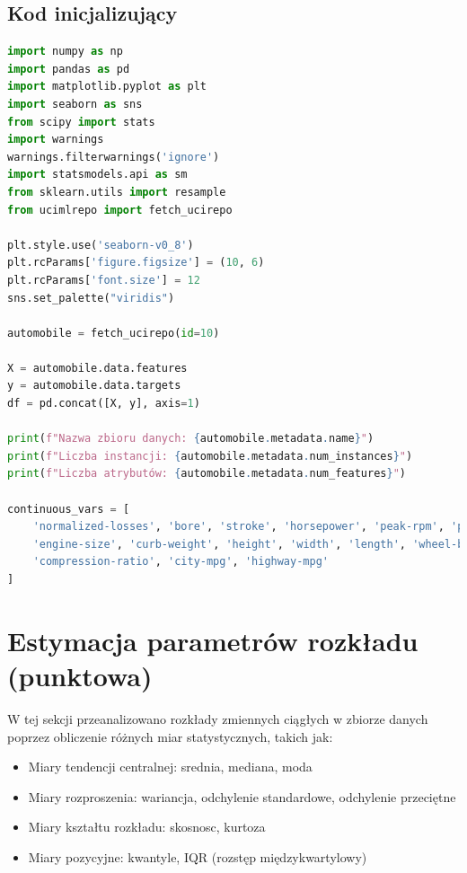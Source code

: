 \documentclass[12pt,a4paper]{article}
\begin{document}
\subsection{Kod inicjalizujący}
\begin{lstlisting}[language=Python, caption=Import bibliotek i wczytywanie danych]
import numpy as np
import pandas as pd
import matplotlib.pyplot as plt
import seaborn as sns
from scipy import stats
import warnings
warnings.filterwarnings('ignore')
import statsmodels.api as sm
from sklearn.utils import resample
from ucimlrepo import fetch_ucirepo

plt.style.use('seaborn-v0_8')
plt.rcParams['figure.figsize'] = (10, 6)
plt.rcParams['font.size'] = 12
sns.set_palette("viridis")

automobile = fetch_ucirepo(id=10)

X = automobile.data.features
y = automobile.data.targets
df = pd.concat([X, y], axis=1)

print(f"Nazwa zbioru danych: {automobile.metadata.name}")
print(f"Liczba instancji: {automobile.metadata.num_instances}")
print(f"Liczba atrybutów: {automobile.metadata.num_features}")

continuous_vars = [
    'normalized-losses', 'bore', 'stroke', 'horsepower', 'peak-rpm', 'price',
    'engine-size', 'curb-weight', 'height', 'width', 'length', 'wheel-base',
    'compression-ratio', 'city-mpg', 'highway-mpg'
]
\end{lstlisting}

\section{Estymacja parametrów rozkładu (punktowa)}

W tej sekcji przeanalizowano rozkłady zmiennych ciągłych w zbiorze danych poprzez obliczenie różnych miar statystycznych, takich jak:
\begin{itemize}
    \item Miary tendencji centralnej: srednia, mediana, moda
    \item Miary rozproszenia: wariancja, odchylenie standardowe, odchylenie przeciętne
    \item Miary kształtu rozkładu: skosnosc, kurtoza
    \item Miary pozycyjne: kwantyle, IQR (rozstęp międzykwartylowy)
\end{itemize}
\end{document}
